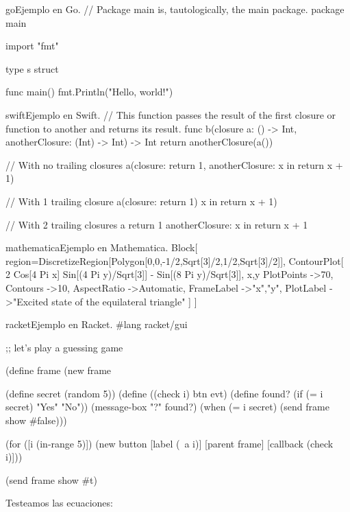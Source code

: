 \begin{sourcecode}{go}{Ejemplo en Go.}
// Package main is, tautologically, the main package.
package main

import "fmt"

type s struct{}

func main() {
	fmt.Println("Hello, world!")
}
\end{sourcecode}

\begin{sourcecode}{swift}{Ejemplo en Swift.}
// This function passes the result of the first closure or function to another and returns its result.
func b(closure a: () -> Int, anotherClosure: (Int) -> Int) -> Int {
    return anotherClosure(a())
}

// With no trailing closures
a(closure: {return 1}, anotherClosure: {x in return x + 1})

// With 1 trailing closure
a(closure: {return 1}) {x in return x + 1})

// With 2 trailing closures
a {return 1} anotherClosure: {x in return x + 1}
\end{sourcecode}

\begin{sourcecode}{mathematica}{Ejemplo en Mathematica.}
Block[
 {region=DiscretizeRegion[Polygon[{{0,0},{-1/2,Sqrt[3]/2},{1/2,Sqrt[3]/2}}]]},
 ContourPlot[
  2 Cos[4 Pi x] Sin[(4 Pi y)/Sqrt[3]] - Sin[(8 Pi y)/Sqrt[3]],
  {x,y} %
  PlotPoints ->70,
  Contours ->10,
  AspectRatio ->Automatic,
  FrameLabel ->{"x","y"},
  PlotLabel ->"Excited state of the equilateral triangle"
 ]
]
\end{sourcecode}

\begin{sourcecode}{racket}{Ejemplo en Racket.}
#lang racket/gui

;; let's play a guessing game

(define frame (new frame%

(define secret (random 5))
(define ((check i) btn evt)
  (define found? (if (= i secret) "Yes" "No"))
  (message-box "?" found?)
  (when (= i secret)
    (send frame show #false)))

(for ([i (in-range 5)])
   (new button%
        [label (~a i)]
        [parent frame]
        [callback (check i)]))

(send frame show #t)
\end{sourcecode}

Testeamos las ecuaciones:


